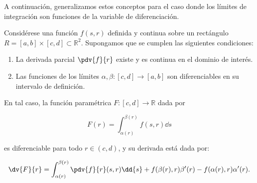 A continuación, generalizamos estos conceptos para el caso donde los límites de integración son funciones de la variable de diferenciación.

\begin{theorem}\label{thm:leibniz-general}

  Considérese una función \( f(s,r) \) definida y continua sobre un rectángulo \( R = [a,b]\times [c,d] \subset \mathbb{R}^2 \). Supongamos que se cumplen las siguientes condiciones:

  \begin{enumerate}
  \item\label{item:1} La derivada parcial \( \pdv{f}{r} \) existe y es continua en el dominio de interés.
  \item\label{item:2} Las funciones de los límites \( \alpha, \beta : [c,d] \to [a,b] \) son diferenciables en su intervalo de definición.
  \end{enumerate}

  En tal caso, la función paramétrica \( F:[c,d] \to \mathbb{R} \) dada por

  \[ F(r) = \int_{\alpha(r)}^{\beta(r)} f(s,r) \dd{s} \]

  es diferenciable para todo \( r \in (c,d) \), y su derivada está dada por:

  \begin{equation}
    \label{eq:leibniz-int}
   \dv{F}{r} = \int_{\alpha(r)}^{\beta(r)} \pdv{f}{r}(s,r) \dd{s} + f(\beta(r),r)\beta'(r) - f(\alpha(r),r)\alpha'(r).
  \end{equation}

\end{theorem}

